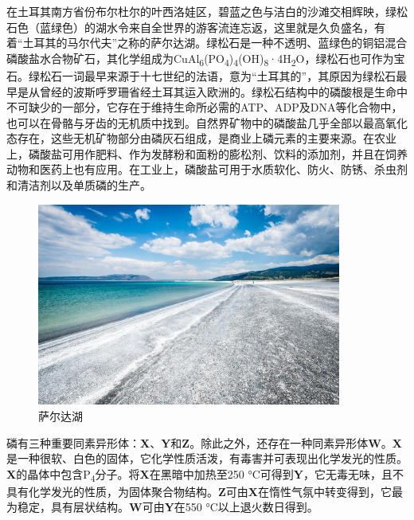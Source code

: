 在土耳其南方省份布尔杜尔的叶西洛娃区，碧蓝之色与洁白的沙滩交相辉映，绿松石色（蓝绿色）的湖水令来自全世界的游客流连忘返，这里就是久负盛名，有着``土耳其的马尔代夫''之称的萨尔达湖。绿松石是一种不透明、蓝绿色的铜铝混合磷酸盐水合物矿石，其化学组成为CuAl\textsubscript{6}(PO\textsubscript{4})\textsubscript{4}(OH)\textsubscript{8}·4H\textsubscript{2}O，绿松石也可作为宝石。绿松石一词最早来源于十七世纪的法语，意为``土耳其的''，其原因为绿松石最早是从曾经的波斯呼罗珊省经土耳其运入欧洲的。绿松石结构中的磷酸根是生命中不可缺少的一部分，它存在于维持生命所必需的ATP、ADP及DNA等化合物中，也可以在骨骼与牙齿的无机质中找到。自然界矿物中的磷酸盐几乎全部以最高氧化态存在，这些无机矿物部分由磷灰石组成，是商业上磷元素的主要来源。在农业上，磷酸盐可用作肥料、作为发酵粉和面粉的膨松剂、饮料的添加剂，并且在饲养动物和医药上也有应用。在工业上，磷酸盐可用于水质软化、防火、防锈、杀虫剂和清洁剂以及单质磷的生产。

\begin{figure}[h]
	\centering
	\includegraphics[width=10cm]{./pic/t12-1.jpg}
	\caption*{萨尔达湖}
\end{figure}

磷有三种重要同素异形体：\textbf{X}、\textbf{Y}和\textbf{Z}。除此之外，还存在一种同素异形体\textbf{W}。\textbf{X}是一种很软、白色的固体，它化学性质活泼，有毒害并可表现出化学发光的性质。\textbf{X}的晶体中包含P\textsubscript{4}分子。将\textbf{X}在黑暗中加热至250 °C可得到\textbf{Y}，它无毒无味，且不具有化学发光的性质，为固体聚合物结构。\textbf{Z}可由\textbf{X}在惰性气氛中转变得到，它最为稳定，具有层状结构。\textbf{W}可由\textbf{Y}在550 °C以上退火数日得到。

